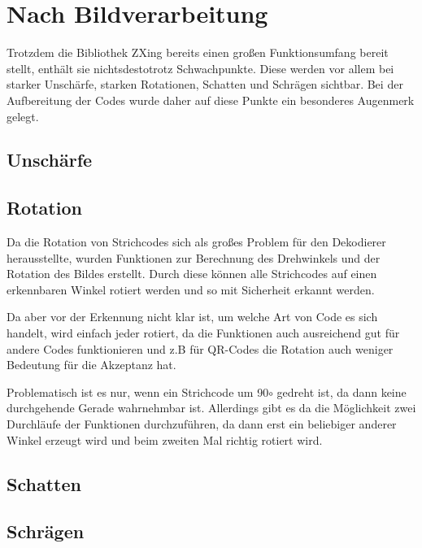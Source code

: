 \section{Nach Bildverarbeitung}
Trotzdem die Bibliothek ZXing bereits einen großen Funktionsumfang bereit stellt, enthält sie nichtsdestotrotz Schwachpunkte. Diese werden vor allem bei starker Unschärfe, starken Rotationen, Schatten und Schrägen sichtbar.
Bei der Aufbereitung der Codes wurde daher auf diese Punkte ein besonderes Augenmerk gelegt.

\subsection*{Unschärfe}



\subsection*{Rotation}
Da die Rotation von Strichcodes sich als großes Problem für den Dekodierer herausstellte, wurden Funktionen zur Berechnung des Drehwinkels und der Rotation des Bildes erstellt. Durch diese können alle Strichcodes auf einen erkennbaren Winkel rotiert werden und so mit Sicherheit erkannt werden.

Da aber vor der Erkennung nicht klar ist, um welche Art von Code es sich handelt, wird einfach jeder rotiert, da die Funktionen auch ausreichend gut für andere Codes funktionieren und z.B für QR-Codes die Rotation auch weniger Bedeutung für die Akzeptanz hat.

Problematisch ist es nur, wenn ein Strichcode um 90$ \circ $ gedreht ist, da dann keine durchgehende Gerade wahrnehmbar ist. Allerdings gibt es da die Möglichkeit zwei Durchläufe der Funktionen durchzuführen, da dann erst ein beliebiger anderer Winkel erzeugt wird und beim zweiten Mal richtig rotiert wird.



\subsection*{Schatten}



\subsection*{Schrägen}

